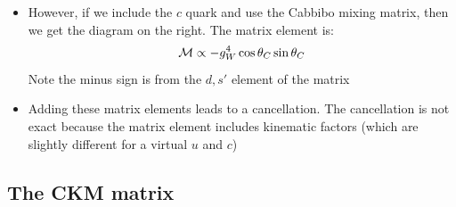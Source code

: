 \begin{itemize}
\begin{itemize}
    \item However, if we include the $c$ quark and use the Cabbibo mixing matrix, then we get the diagram on the right. The matrix element is:
    \begin{equation}
      \mathcal{M} \propto -g_W^4\cos\theta_C\sin\theta_C
    \end{equation}
    Note the minus sign is from the $d,s'$ element of the matrix
    \item Adding these matrix elements leads to a cancellation. The cancellation is not exact because the matrix element includes kinematic factors (which are slightly different for a virtual $u$ and $c$)
  \end{itemize}
\end{itemize}

  \subsection{The CKM matrix}
